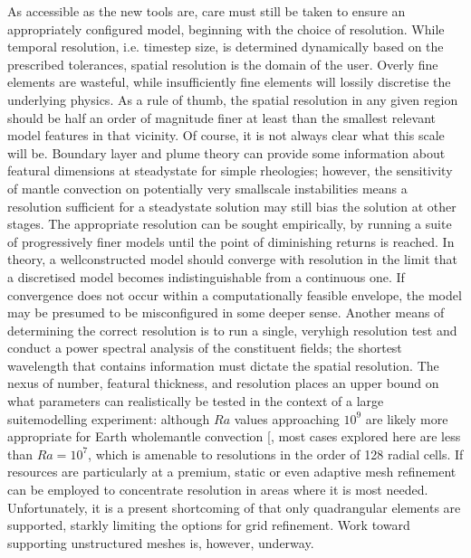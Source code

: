 \documentclass[letterpaper,10pt,english]{jupyterBook}
\begin{document}
\sphinxAtStartPar
As accessible as the new tools are, care must still be taken to ensure an appropriately configured model, beginning with the choice of resolution. While temporal resolution, i.e. timestep size, is determined dynamically based on the prescribed tolerances, spatial resolution is the domain of the user. Overly fine elements are wasteful, while insufficiently fine elements will lossily discretise the underlying physics. As a rule of thumb, the spatial resolution in any given region should be half an order of magnitude finer at least than the smallest relevant model features in that vicinity. Of course, it is not always clear  what this scale will be. Boundary layer and plume theory can provide some information about featural dimensions at steady\sphinxhyphen{}state for simple rheologies; however, the sensitivity of mantle convection on potentially very small\sphinxhyphen{}scale instabilities means a resolution sufficient for a steady\sphinxhyphen{}state solution may still bias the solution at other stages. The appropriate resolution can be sought empirically, by running a suite of progressively finer models until the point of diminishing returns is reached. In theory, a well\sphinxhyphen{}constructed model should converge with resolution in the limit that a discretised model becomes indistinguishable from a continuous one. If convergence does not occur within a computationally feasible envelope, the model may be presumed to be misconfigured in some deeper sense. Another means of determining the correct resolution is to run a single, very\sphinxhyphen{}high resolution test and conduct a power spectral analysis of the constituent fields; the shortest wavelength that contains information must dictate the spatial resolution. The nexus of  number, featural thickness, and resolution places an upper bound on what parameters can realistically be tested in the context of a large suite\sphinxhyphen{}modelling experiment: although \(Ra\) values approaching \(10^9\) are likely more appropriate for Earth whole\sphinxhyphen{}mantle convection {[}\sphinxcite{references:id339}{]}, most cases explored here are less than \(Ra=10^7\), which is amenable to resolutions in the order of 128 radial cells. If resources are particularly at a premium, static or even adaptive mesh refinement can be employed to concentrate resolution in areas where it is most needed. Unfortunately, it is a present shortcoming of  that only quadrangular elements are supported, starkly limiting the options for grid refinement. Work toward supporting unstructured meshes is, however, underway.
\end{document}
